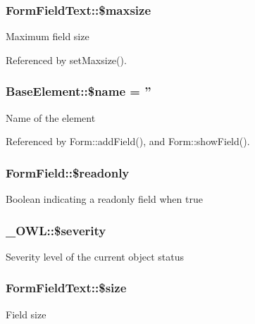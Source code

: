 \subsubsection[{\$maxsize}]{\setlength{\rightskip}{0pt plus 5cm}FormFieldText::\$maxsize}\label{classFormFieldText_ac984f8586351de82eb4a461f053d5329}
Maximum field size 

Referenced by setMaxsize().

\subsubsection[{\$name}]{\setlength{\rightskip}{0pt plus 5cm}BaseElement::\$name = ''}\label{classBaseElement_a30b8cff187a9de659a70daf287d66f45}
Name of the element 

Referenced by Form::addField(), and Form::showField().

\subsubsection[{\$readonly}]{\setlength{\rightskip}{0pt plus 5cm}FormField::\$readonly}\label{classFormField_a78ba5d4b9127e75e8ccf86f397b5d9ac}
Boolean indicating a readonly field when true 
\subsubsection[{\$severity}]{\setlength{\rightskip}{0pt plus 5cm}\_\-OWL::\$severity}\label{class__OWL_ad26b40a9dbbacb33e299b17826f8327c}
Severity level of the current object status 
\subsubsection[{\$size}]{\setlength{\rightskip}{0pt plus 5cm}FormFieldText::\$size}\label{classFormFieldText_a1db9cf2b51d60717eab0d295e97bcd5b}
Field size 

